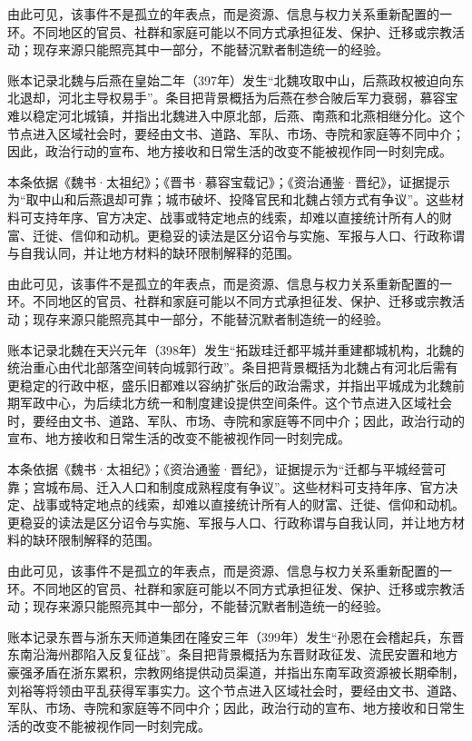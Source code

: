 由此可见，该事件不是孤立的年表点，而是资源、信息与权力关系重新配置的一环。不同地区的官员、社群和家庭可能以不同方式承担征发、保护、迁移或宗教活动；现存来源只能照亮其中一部分，不能替沉默者制造统一的经验。

账本记录北魏与后燕在皇始二年（397年）发生“北魏攻取中山，后燕政权被迫向东北退却，河北主导权易手”。条目把背景概括为后燕在参合陂后军力衰弱，慕容宝难以稳定河北城镇，并指出北魏进入中原北部，后燕、南燕和北燕相继分化。这个节点进入区域社会时，要经由文书、道路、军队、市场、寺院和家庭等不同中介；因此，政治行动的宣布、地方接收和日常生活的改变不能被视作同一时刻完成。

本条依据《魏书·太祖纪》；《晋书·慕容宝载记》；《资治通鉴·晋纪》，证据提示为“取中山和后燕退却可靠；城市破坏、投降官民和北魏占领方式有争议”。这些材料可支持年序、官方决定、战事或特定地点的线索，却难以直接统计所有人的财富、迁徙、信仰和动机。更稳妥的读法是区分诏令与实施、军报与人口、行政称谓与自我认同，并让地方材料的缺环限制解释的范围。

由此可见，该事件不是孤立的年表点，而是资源、信息与权力关系重新配置的一环。不同地区的官员、社群和家庭可能以不同方式承担征发、保护、迁移或宗教活动；现存来源只能照亮其中一部分，不能替沉默者制造统一的经验。

账本记录北魏在天兴元年（398年）发生“拓跋珪迁都平城并重建都城机构，北魏的统治重心由代北部落空间转向城郭行政”。条目把背景概括为北魏占有河北后需有更稳定的行政中枢，盛乐旧都难以容纳扩张后的政治需求，并指出平城成为北魏前期军政中心，为后续北方统一和制度建设提供空间条件。这个节点进入区域社会时，要经由文书、道路、军队、市场、寺院和家庭等不同中介；因此，政治行动的宣布、地方接收和日常生活的改变不能被视作同一时刻完成。

本条依据《魏书·太祖纪》；《资治通鉴·晋纪》，证据提示为“迁都与平城经营可靠；宫城布局、迁入人口和制度成熟程度有争议”。这些材料可支持年序、官方决定、战事或特定地点的线索，却难以直接统计所有人的财富、迁徙、信仰和动机。更稳妥的读法是区分诏令与实施、军报与人口、行政称谓与自我认同，并让地方材料的缺环限制解释的范围。

由此可见，该事件不是孤立的年表点，而是资源、信息与权力关系重新配置的一环。不同地区的官员、社群和家庭可能以不同方式承担征发、保护、迁移或宗教活动；现存来源只能照亮其中一部分，不能替沉默者制造统一的经验。

账本记录东晋与浙东天师道集团在隆安三年（399年）发生“孙恩在会稽起兵，东晋东南沿海州郡陷入反复征战”。条目把背景概括为东晋财政征发、流民安置和地方豪强矛盾在浙东累积，宗教网络提供动员渠道，并指出东南军政资源被长期牵制，刘裕等将领由平乱获得军事实力。这个节点进入区域社会时，要经由文书、道路、军队、市场、寺院和家庭等不同中介；因此，政治行动的宣布、地方接收和日常生活的改变不能被视作同一时刻完成。

